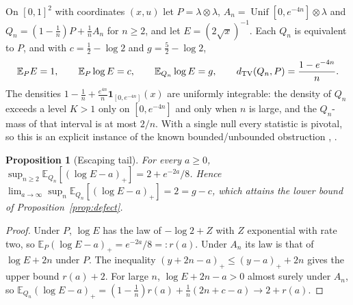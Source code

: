 \documentclass[11pt,a4paper]{article}
\newtheorem{proposition}[theorem]{Proposition}
\theoremstyle{definition}
\theoremstyle{remark}
\newcommand{\EE}{\mathbb E}
\newcommand{\one}{\mathbf 1}
\newcommand{\Unif}{\operatorname{Unif}}
\begin{document}
On \([0,1]^2\) with coordinates \((x,u)\) let \(P=\lambda\otimes\lambda\), \(A_n=\Unif[0,e^{-4n}]\otimes\lambda\) and \(Q_n=(1-\frac1n)P+\frac1nA_n\) for \(n\ge2\), and let \(E=(2\sqrt x)^{-1}\). Each \(Q_n\) is equivalent to \(P\), and with \(c=\frac12-\log2\) and \(g=\frac52-\log2\),
\begin{equation}\label{eq:counterstats}
 \EE_PE=1,\qquad \EE_P\log E=c,\qquad \EE_{Q_n}\log E=g,\qquad d_{\rm TV}(Q_n,P)=\frac{1-e^{-4n}}n .
\end{equation}
The densities \(1-\frac1n+\frac{e^{4n}}n\one_{[0,e^{-4n}]}(x)\) are uniformly integrable: the density of \(Q_n\) exceeds a level \(K>1\) only on \([0,e^{-4n}]\) and only when \(n\) is large, and the \(Q_n\)-mass of that interval is at most \(2/n\). With a single null every statistic is pivotal, so this is an explicit instance of the known bounded/unbounded obstruction \cite[Example~3.15]{RamdasWang}, \cite[Example~5.1]{GROW}.

\begin{proposition}[Escaping tail]\label{prop:exacttail}
For every \(a\ge0\), \(\sup_{n\ge2}\EE_{Q_n}[(\log E-a)_+]=2+e^{-2a}/8\). Hence \(\lim_{a\to\infty}\sup_n\EE_{Q_n}[(\log E-a)_+]=2=g-c\), which attains the lower bound of Proposition~\ref{prop:defect}.
\end{proposition}
\begin{proof}
Under \(P\), \(\log E\) has the law of \(-\log2+Z\) with \(Z\) exponential with rate two, so \(\EE_P(\log E-a)_+=e^{-2a}/8=:r(a)\). Under \(A_n\) its law is that of \(\log E+2n\) under \(P\). The inequality \((y+2n-a)_+\le(y-a)_++2n\) gives the upper bound \(r(a)+2\). For large \(n\), \(\log E+2n-a>0\) almost surely under \(A_n\), so \(\EE_{Q_n}(\log E-a)_+=(1-\frac1n)r(a)+\frac1n(2n+c-a)\to2+r(a)\).
\end{proof}
\end{document}
